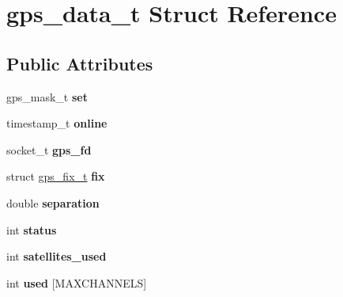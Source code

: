\hypertarget{structgps__data__t}{\section{gps\-\_\-data\-\_\-t \-Struct \-Reference}
\label{structgps__data__t}
}
\subsection*{\-Public \-Attributes}
\begin{DoxyCompactItemize}
\item 
\hypertarget{structgps__data__t_a9068eeec7652d72379568bae82242480}{gps\-\_\-mask\-\_\-t {\bfseries set}}\label{structgps__data__t_a9068eeec7652d72379568bae82242480}

\item 
\hypertarget{structgps__data__t_a25dd255d8f76d9d3b4501b509c679614}{timestamp\-\_\-t {\bfseries online}}\label{structgps__data__t_a25dd255d8f76d9d3b4501b509c679614}

\item 
\hypertarget{structgps__data__t_a754af2cb8fc454207652d6f8f7c89bcb}{socket\-\_\-t {\bfseries gps\-\_\-fd}}\label{structgps__data__t_a754af2cb8fc454207652d6f8f7c89bcb}

\item 
\hypertarget{structgps__data__t_a32f7a6bb8f67c6e1d16979b3d0d2be78}{struct \hyperlink{structgps__fix__t}{gps\-\_\-fix\-\_\-t} {\bfseries fix}}\label{structgps__data__t_a32f7a6bb8f67c6e1d16979b3d0d2be78}

\item 
\hypertarget{structgps__data__t_ad69a6ee64c3bd4f705bf2bdc79392c4b}{double {\bfseries separation}}\label{structgps__data__t_ad69a6ee64c3bd4f705bf2bdc79392c4b}

\item 
\hypertarget{structgps__data__t_a606d269ddb1a82bfa38b35a0f552808a}{int {\bfseries status}}\label{structgps__data__t_a606d269ddb1a82bfa38b35a0f552808a}

\item 
\hypertarget{structgps__data__t_a93642ea180a5fafc66aac193eb4f97d9}{int {\bfseries satellites\-\_\-used}}\label{structgps__data__t_a93642ea180a5fafc66aac193eb4f97d9}

\item 
\hypertarget{structgps__data__t_a0797696e0e9469798dd4ae6ce32dcb13}{int {\bfseries used} \mbox{[}\-M\-A\-X\-C\-H\-A\-N\-N\-E\-L\-S\mbox{]}}\label{structgps__data__t_a0797696e0e9469798dd4ae6ce32dcb13}


\end{DoxyCompactItemize}
